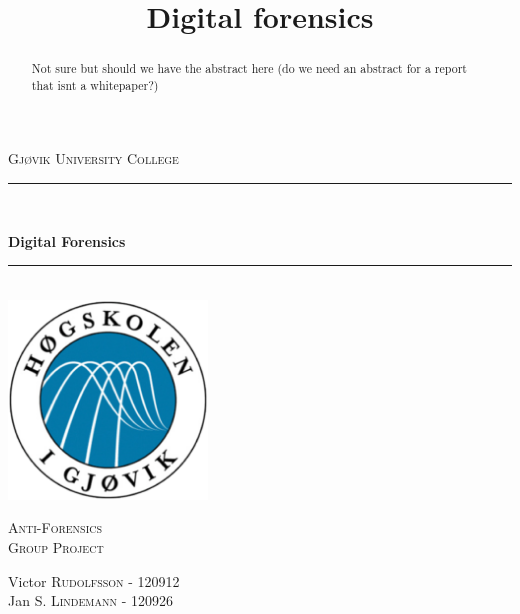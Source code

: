 

\title{Digital forensics}

\begin{titlepage}

\newcommand{\HRule}{\rule{\linewidth}{0.5mm}} %

\center %
\begin{myfont}
\textsc{{\large Gjøvik University College}}\\[0.5cm] %
\end{myfont}
\HRule \\[0.4cm]

\begin{myfont}
{ \huge \bfseries Digital Forensics}\\[0cm] %
\end{myfont}

\HRule \\[0.4cm]
\includegraphics[width=200px, height=200px]{logo}\\[0.8cm] %
\begin{myfont}
\textsc{\Large Anti-Forensics}\\[0.5cm] %
\textsc{\large Group Project}\\[0.5cm] %
\end{myfont}


\begin{minipage}{0.44\textwidth}
\begin{flushleft} \large
\begin{myfont}
Victor \textsc{Rudolfsson} - 120912\\ %
Jan  \textsc{S. Lindemann} - 120926\\ %
\end{myfont}
\end{flushleft}
\end{minipage}
\vspace*{2cm}
\begin{abstract}
 Not sure but should we have the abstract here (do we need an abstract for a report that isnt a whitepaper?)
\end{abstract}


\end{titlepage}
